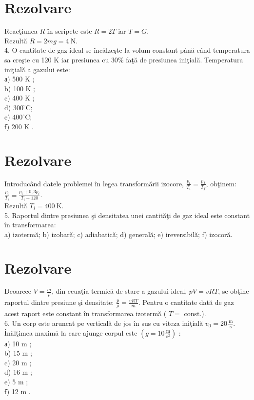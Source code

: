 \section*{Rezolvare}
Reacţiunea $R$ în scripete este $R=2 T$ iar $T=G$.\\
Rezultă $R=2 m g=4 \mathrm{~N}$.\\
4. O cantitate de gaz ideal se încălzeşte la volum constant până când temperatura sa creşte cu 120 K iar presiunea cu $30 \%$ faţă de presiunea iniţială. Temperatura iniţială a gazului este:\\
а) 500 K ;\\
b) 100 K ;\\
c) 400 K ;\\
d) $300^{\circ} \mathrm{C}$;\\
e) $400^{\circ} \mathrm{C}$;\\
f) 200 K .

\section*{Rezolvare}
Introducând datele problemei în legea transformării izocore, $\frac{p_{i}}{T_{i}}=\frac{p_{f}}{T_{f}}$, obţinem: $\frac{p_{i}}{T_{i}}=\frac{p_{i}+0,3 p_{i}}{T_{i}+120}$.\\
Rezultă $T_{i}=400 \mathrm{~K}$.\\
5. Raportul dintre presiunea şi densitatea unei cantităţi de gaz ideal este constant în transformarea:\\
a) izotermă; b) izobară; c) adiabatică; d) generală; e) ireversibilă; f) izocoră.

\section*{Rezolvare}
Deoarece $V=\frac{m}{\rho}$, din ecuaţia termică de stare a gazului ideal, $p V=v R T$, se obţine raportul dintre presiune şi densitate: $\frac{p}{\rho}=\frac{v R T}{m}$. Pentru o cantitate dată de gaz acest raport este constant în transformarea izotermă ( $T=$ const.).\\
6. Un corp este aruncat pe verticală de jos în sus cu viteza iniţială $v_{0}=20 \frac{\mathrm{~m}}{\mathrm{~s}}$. Înălţimea maximă la care ajunge corpul este $\left(g=10 \frac{\mathrm{~m}}{\mathrm{~s}^{2}}\right)$ :\\
а) 10 m ;\\
b) 15 m ;\\
c) 20 m ;\\
d) 16 m ;\\
e) 5 m ;\\
f) 12 m .

